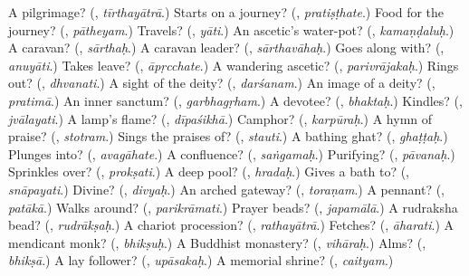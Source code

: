 \begin{tcolorbox}[breakable,colback=teal!4,colframe=teal!35!black,title={Before you move on}]
A pilgrimage? (\textbf{}, \emph{tīrthayātrā}.) Starts on a journey? (\textbf{}, \emph{pratiṣṭhate}.) Food for the journey? (\textbf{}, \emph{pātheyam}.) Travels? (\textbf{}, \emph{yāti}.) An ascetic's water-pot? (\textbf{}, \emph{kamaṇḍaluḥ}.) A caravan? (\textbf{}, \emph{sārthaḥ}.) A caravan leader? (\textbf{}, \emph{sārthavāhaḥ}.) Goes along with? (\textbf{}, \emph{anuyāti}.) Takes leave? (\textbf{}, \emph{āpṛcchate}.) A wandering ascetic? (\textbf{}, \emph{parivrājakaḥ}.) Rings out? (\textbf{}, \emph{dhvanati}.) A sight of the deity? (\textbf{}, \emph{darśanam}.) An image of a deity? (\textbf{}, \emph{pratimā}.) An inner sanctum? (\textbf{}, \emph{garbhagṛham}.) A devotee? (\textbf{}, \emph{bhaktaḥ}.) Kindles? (\textbf{}, \emph{jvālayati}.) A lamp's flame? (\textbf{}, \emph{dīpaśikhā}.) Camphor? (\textbf{}, \emph{karpūraḥ}.) A hymn of praise? (\textbf{}, \emph{stotram}.) Sings the praises of? (\textbf{}, \emph{stauti}.) A bathing ghat? (\textbf{}, \emph{ghaṭṭaḥ}.) Plunges into? (\textbf{}, \emph{avagāhate}.) A confluence? (\textbf{}, \emph{saṅgamaḥ}.) Purifying? (\textbf{}, \emph{pāvanaḥ}.) Sprinkles over? (\textbf{}, \emph{prokṣati}.) A deep pool? (\textbf{}, \emph{hradaḥ}.) Gives a bath to? (\textbf{}, \emph{snāpayati}.) Divine? (\textbf{}, \emph{divyaḥ}.) An arched gateway? (\textbf{}, \emph{toraṇam}.) A pennant? (\textbf{}, \emph{patākā}.) Walks around? (\textbf{}, \emph{parikrāmati}.) Prayer beads? (\textbf{}, \emph{japamālā}.) A rudraksha bead? (\textbf{}, \emph{rudrākṣaḥ}.) A chariot procession? (\textbf{}, \emph{rathayātrā}.) Fetches? (\textbf{}, \emph{āharati}.) A mendicant monk? (\textbf{}, \emph{bhikṣuḥ}.) A Buddhist monastery? (\textbf{}, \emph{vihāraḥ}.) Alms? (\textbf{}, \emph{bhikṣā}.) A lay follower? (\textbf{}, \emph{upāsakaḥ}.) A memorial shrine? (\textbf{}, \emph{caityam}.)
\end{tcolorbox}
